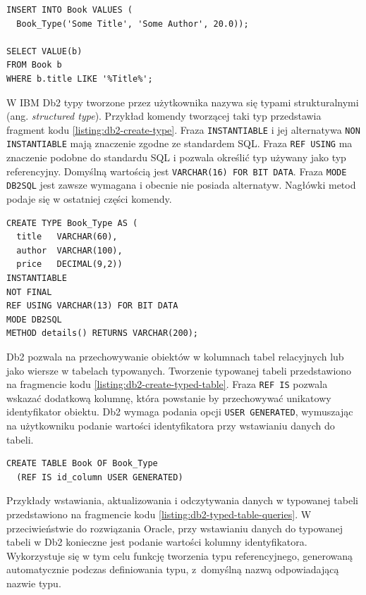 \documentclass[a4paper,twoside,12pt]{book}
\begin{document}
\begin{lstlisting}[style=SQL, caption={Korzystanie z tabeli obiektowej w Oracle Database.}, label={listing:oracle-insert-and-select}, captionpos=b]
INSERT INTO Book VALUES (
  Book_Type('Some Title', 'Some Author', 20.0));

SELECT VALUE(b) 
FROM Book b
WHERE b.title LIKE '%Title%';
\end{lstlisting}

W IBM Db2 typy tworzone przez użytkownika nazywa się typami strukturalnymi (ang. \textit{structured type}). Przykład komendy tworzącej taki typ przedstawia fragment kodu \ref{listing:db2-create-type}. Fraza \lstinline{INSTANTIABLE} i jej alternatywa \lstinline{NON INSTANTIABLE} mają znaczenie zgodne ze standardem SQL. Fraza \lstinline{REF USING} ma znaczenie podobne do standardu SQL i pozwala określić typ używany jako typ referencyjny. Domyślną wartością jest \lstinline{VARCHAR(16) FOR BIT DATA}. Fraza \lstinline{MODE DB2SQL} jest zawsze wymagana i obecnie nie posiada alternatyw. Nagłówki metod podaje się w ostatniej części komendy.

\begin{lstlisting}[style=SQL, caption={Tworzenie typu w IBM Db2.}, label={listing:db2-create-type}, captionpos=b]
CREATE TYPE Book_Type AS (
  title   VARCHAR(60),                  
  author  VARCHAR(100),             
  price   DECIMAL(9,2))
INSTANTIABLE
NOT FINAL
REF USING VARCHAR(13) FOR BIT DATA
MODE DB2SQL
METHOD details() RETURNS VARCHAR(200);
\end{lstlisting}

Db2 pozwala na przechowywanie obiektów w kolumnach tabel relacyjnych lub jako wiersze w tabelach typowanych. Tworzenie typowanej tabeli przedstawiono na fragmencie kodu \ref{listing:db2-create-typed-table}. Fraza \lstinline{REF IS} pozwala wskazać dodatkową kolumnę, która powstanie by przechowywać unikatowy identyfikator obiektu. Db2 wymaga podania opcji \lstinline{USER GENERATED}, wymuszając na użytkowniku podanie wartości identyfikatora przy wstawianiu danych do tabeli.

\begin{lstlisting}[style=SQL, caption={Tworzenie typowanej tabeli w IBM Db2.}, label={listing:db2-create-typed-table}, captionpos=b]
CREATE TABLE Book OF Book_Type
  (REF IS id_column USER GENERATED)
\end{lstlisting}


Przykłady wstawiania, aktualizowania i odczytywania danych w typowanej tabeli przedstawiono na fragmencie kodu \ref{listing:db2-typed-table-queries}. W przeciwieństwie do rozwiązania Oracle, przy wstawianiu danych do typowanej tabeli w Db2 konieczne jest podanie wartości kolumny identyfikatora. Wykorzystuje się w tym celu funkcję tworzenia typu referencyjnego, generowaną automatycznie podczas definiowania typu, z~domyślną nazwą odpowiadającą nazwie typu.
\end{document}

